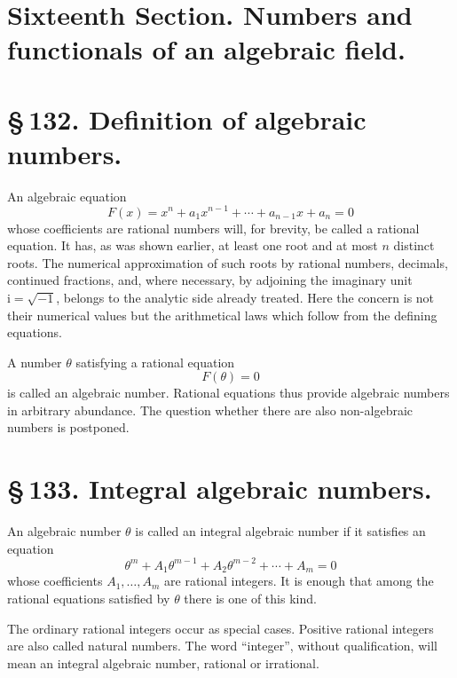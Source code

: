 \documentclass[11pt]{article}
\newcommand{\ii}{\mathrm{i}}
\begin{document}
\section*{Sixteenth Section. Numbers and functionals of an algebraic field.}

\section*{\S\,132. Definition of algebraic numbers.}

An algebraic equation
\begin{equation}
F(x)=x^n+a_1x^{n-1}+\cdots +a_{n-1}x+a_n=0
\tag{1}
\end{equation}
whose coefficients are rational numbers will, for brevity, be called
a rational equation. It has, as was shown earlier, at least one root
and at most \(n\) distinct roots. The numerical approximation of such
roots by rational numbers, decimals, continued fractions, and, where
necessary, by adjoining the imaginary unit \(\ii=\sqrt{-1}\), belongs
to the analytic side already treated. Here the concern is not their
numerical values but the arithmetical laws which follow from the
defining equations.

A number \(\theta\) satisfying a rational equation
\[
F(\theta)=0
\]
is called an algebraic number. Rational equations thus provide
algebraic numbers in arbitrary abundance. The question whether there
are also non-algebraic numbers is postponed.

\section*{\S\,133. Integral algebraic numbers.}

An algebraic number \(\theta\) is called an integral algebraic number
if it satisfies an equation
\begin{equation}
\theta^m+A_1\theta^{m-1}+A_2\theta^{m-2}+\cdots +A_m=0
\tag{1}
\end{equation}
whose coefficients \(A_1,\ldots,A_m\) are rational integers. It is
enough that among the rational equations satisfied by \(\theta\) there
is one of this kind.

The ordinary rational integers occur as special cases. Positive
rational integers are also called natural numbers. The word
``integer'', without qualification, will mean an integral algebraic
number, rational or irrational.
\end{document}
